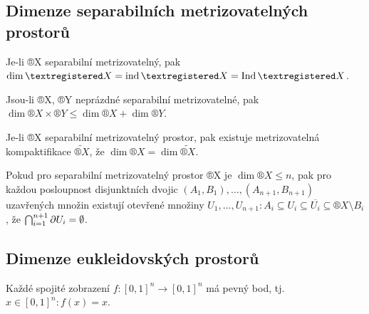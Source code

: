 \documentclass[12pt]{article}                   %
\begin{document}
    \subsection{Dimenze separabilních metrizovatelných prostorů}
        \begin{veta}
            Je-li ®X separabilní metrizovatelný, pak $\dim ®X = \ind ®X = \Ind ®X$.

            Jsou-li ®X, ®Y neprázdné separabilní metrizovatelné, pak $\dim ®X \times ®Y ≤ \dim ®X + \dim ®Y$.
        \end{veta}

        \begin{veta}
            Je-li ®X separabilní metrizovatelný prostor, pak existuje metrizovatelná kompaktifikace $\tilde{®X}$, že $\dim ®X = \dim \tilde{®X}$.
        \end{veta}

        \begin{lemma}[O oddělování]
            Pokud pro separabilní metrizovatelný prostor ®X je $\dim ®X ≤ n$, pak pro každou posloupnost disjunktních dvojic $(A_1, B_1), …, (A_{n+1}, B_{n+1})$ uzavřených množin existují otevřené množiny $U_1, …, U_{n+1}: A_i \subseteq U_i \subseteq \overline{U_i} \subseteq ®X \setminus B_i$, že $\bigcap_{i = 1}^{n+1} \partial U_i = \emptyset$.
        \end{lemma}

    \subsection{Dimenze eukleidovských prostorů}
        \begin{veta}
            Každé spojité zobrazení $f: [0, 1]^n \rightarrow [0, 1]^n$ má pevný bod, tj. $x \in [0, 1]^n: f(x) = x$.
        \end{veta}
\end{document}

